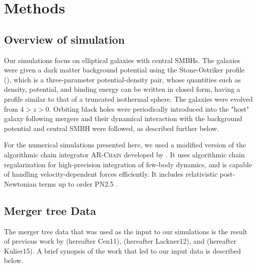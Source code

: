 \documentclass[english, apj]{emulateapj}
\begin{document}
\section{Methods}\label{sec:methods}

\subsection{Overview of simulation}
Our simulations focus on elliptical galaxies with central SMBHs. The galaxies were given a dark matter background potential using the Stone-Ostriker profile (\citet{2015ApJ...806L..28S}), which is a three-parameter potential-density pair, whose quantities such as density, potential, and binding energy can be written in closed form, having a profile similar to that of a truncated isothermal sphere.  The galaxies were evolved from $4 > z > 0$.  Orbiting black holes were periodically introduced into the "host" galaxy following mergers and their dynamical interaction with the background potential and central SMBH were followed, as described further below.

For the numerical simulations presented here, we used a modified version of the algorithmic chain integrator \textsc{AR-Chain} developed by \citet{2006MNRAS.372..219M}. It uses algorithmic chain regularization for high-precision integration of few-body dynamics, and is capable of handling velocity-dependent forces efficiently. It includes relativistic post-Newtonian terms up to order PN2.5 \citep{2008AJ....135.2398M}.


\subsection{Merger tree Data}
The merger tree data that was used as the input to our simulations is the result of previous work by \citet{2011ApJ...741...99C, 2011ApJ...742L..33C, 2012ApJ...753...17C, 2012ApJ...748..121C, 2013ApJ...770..139C} (hereafter Cen11), \citet{2012MNRAS.425..641L} (hereafter Lackner12), and \citet{2015ApJ...799..178K} (hereafter Kulier15).  A brief synopsis of the work that led to our input data is described below.
\end{document}
